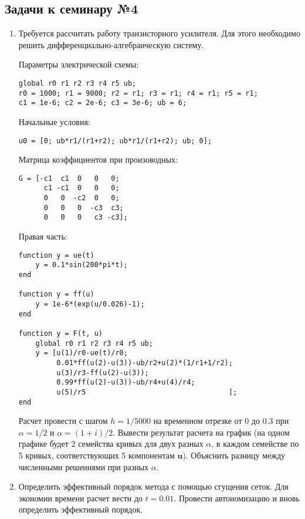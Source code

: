 \subsection{Задачи к семинару №4}
\begin{enumerate}
\item Требуется рассчитать работу транзисторного усилителя. Для этого необходимо решить дифференциально-алгебраическую систему.

Параметры электрической схемы:
\begin{matlablisting}
	\begin{lstlisting}
global r0 r1 r2 r3 r4 r5 ub;
r0 = 1000; r1 = 9000; r2 = r1; r3 = r1; r4 = r1; r5 = r1;
c1 = 1e-6; c2 = 2e-6; c3 = 3e-6; ub = 6;
	\end{lstlisting}
\end{matlablisting}
Начальные условия:
\begin{matlablisting}
	\begin{lstlisting}
u0 = [0; ub*r1/(r1+r2); ub*r1/(r1+r2); ub; 0];
	\end{lstlisting}
\end{matlablisting}
Матрица коэффициентов при произоводных:
\begin{matlablisting}
	\begin{lstlisting}
G = [-c1  c1  0   0   0;
      c1 -c1  0   0   0;
      0   0  -c2  0   0;
      0   0   0  -c3  c3;
      0   0   0   c3 -c3];
	\end{lstlisting}
\end{matlablisting}
Правая часть:
\begin{matlablisting}
	\begin{lstlisting}
function y = ue(t)
    y = 0.1*sin(200*pi*t);
end

function y = ff(u)
    y = 1e-6*(exp(u/0.026)-1);
end

function y = F(t, u)
    global r0 r1 r2 r3 r4 r5 ub;
    y = [u(1)/r0-ue(t)/r0; 
         0.01*ff(u(2)-u(3))-ub/r2+u(2)*(1/r1+1/r2);
         u(3)/r3-ff(u(2)-u(3)); 
         0.99*ff(u(2)-u(3))-ub/r4+u(4)/r4; 
         u(5)/r5                                  ];
end
	\end{lstlisting}
\end{matlablisting}
Расчет провести с шагом $h = 1/5000$ на временном отрезке от 0 до 0.3 при $\alpha = 1/2$ и $\alpha = (1+i)/2$. Вывести результат расчета на график (на одном графике будет 2 семейства кривых для двух разных $\alpha$, в каждом семействе по 5 кривых, соответствующих 5 компонентам $\mathbf{u}$). Объяснить разницу между численными решениями при разных $\alpha$.
\item Определить  эффективный порядок метода с помощью сгущения сеток. Для экономии времени расчет вести до $t = 0.01$. Провести автономизацию и вновь определить эффективный порядок.
\end{enumerate}